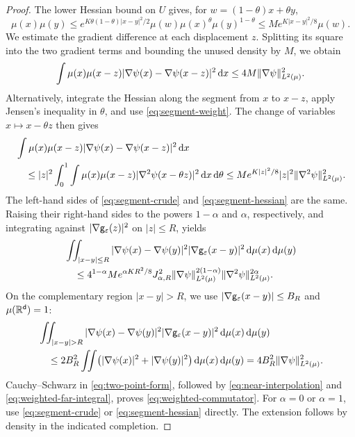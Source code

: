 \documentclass[11pt,reqno]{amsart}
\numberwithin{equation}{section}
\theoremstyle{plain}
\theoremstyle{remark}
\DeclarePairedDelimiter{\norm}{\lVert}{\rVert}
\renewcommand{\d}{\mathsf{d}}\newcommand{\s}{\mathsf{s}}
\begin{document}
\begin{proof}
The lower Hessian bound on $U$ gives, for $w=(1-\theta)x+\theta y$,
\begin{equation}\label{eq:segment-weight}
 \mu(x)\mu(y)\le
 e^{K\theta(1-\theta)|x-y|^2/2}\mu(w)\mu(x)^\theta\mu(y)^{1-\theta}
 \le M e^{K|x-y|^2/8}\mu(w).
\end{equation}
We estimate the gradient difference at each displacement $z$. Splitting its square into the two gradient terms and bounding the unused density by $M$, we obtain
\begin{equation}\label{eq:segment-crude}
 \int\mu(x)\mu(x-z)|\nabla\psi(x)-\nabla\psi(x-z)|^2\dd x
 \le4M\norm{\nabla\psi}_{L^2(\mu)}^2.
\end{equation}
Alternatively, integrate the Hessian along the segment from $x$ to $x-z$, apply Jensen's inequality in $\theta$, and use \eqref{eq:segment-weight}. The change of variables $x\mapsto x-\theta z$ then gives
\begin{align}
 &\int\mu(x)\mu(x-z)|\nabla\psi(x)-\nabla\psi(x-z)|^2\dd x\notag\\
 &\quad\le |z|^2\int_0^1\int\mu(x)\mu(x-z)
                    |\nabla^2\psi(x-\theta z)|^2\dd x\dd\theta
 \le M e^{K|z|^2/8}|z|^2\norm{\nabla^2\psi}_{L^2(\mu)}^2.
 \label{eq:segment-hessian}
\end{align}
The left-hand sides of \eqref{eq:segment-crude} and \eqref{eq:segment-hessian} are the same. Raising their right-hand sides to the powers $1-\alpha$ and $\alpha$, respectively, and integrating against $|\nabla\mathsf g_\varepsilon(z)|^2$ on $|z|\le R$, yields
\begin{align}
 &\iint_{|x-y|\le R}|\nabla\psi(x)-\nabla\psi(y)|^2
                  |\nabla\g_\varepsilon(x-y)|^2\dd\mu(x)\dd\mu(y)\notag\\
 &\quad\le4^{1-\alpha}M e^{\alpha KR^2/8}J_{\alpha,R}^2
       \norm{\nabla\psi}_{L^2(\mu)}^{2(1-\alpha)}
       \norm{\nabla^2\psi}_{L^2(\mu)}^{2\alpha}.
 \label{eq:near-interpolation}
\end{align}
On the complementary region $|x-y|>R$, we use $|\nabla\mathsf g_\varepsilon(x-y)|\le B_R$ and $\mu(\R^\d)=1$:
\begin{align}
 &\iint_{|x-y|>R}|\nabla\psi(x)-\nabla\psi(y)|^2
                 |\nabla\g_\varepsilon(x-y)|^2\dd\mu(x)\dd\mu(y)\notag\\
 &\quad\le 2B_R^2\iint\bigl(|\nabla\psi(x)|^2+|\nabla\psi(y)|^2\bigr)
                         \dd\mu(x)\dd\mu(y)
 =4B_R^2\norm{\nabla\psi}_{L^2(\mu)}^2.
 \label{eq:weighted-far-integral}
\end{align}
Cauchy--Schwarz in \eqref{eq:two-point-form}, followed by \eqref{eq:near-interpolation} and \eqref{eq:weighted-far-integral}, proves \eqref{eq:weighted-commutator}. For $\alpha=0$ or $\alpha=1$, use \eqref{eq:segment-crude} or \eqref{eq:segment-hessian} directly. The extension follows by density in the indicated completion.
\end{proof}
\end{document}
